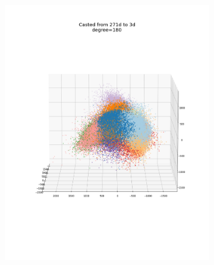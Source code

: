 \documentclass[12pt, a4paper]{article}
\begin{document}
\begin{figure}[h]
\begin{subfigure}{0.3\linewidth}
    \end{subfigure}
    \newline
    \begin{subfigure}{0.3\linewidth}
        \centering
        \includegraphics[width=\linewidth]{images/q4/h/3dangle180.png}
    \end{subfigure}
    \hfill
    \begin{subfigure}{0.3\linewidth}
        \centering

\end{subfigure}
\end{figure}
\end{document}
